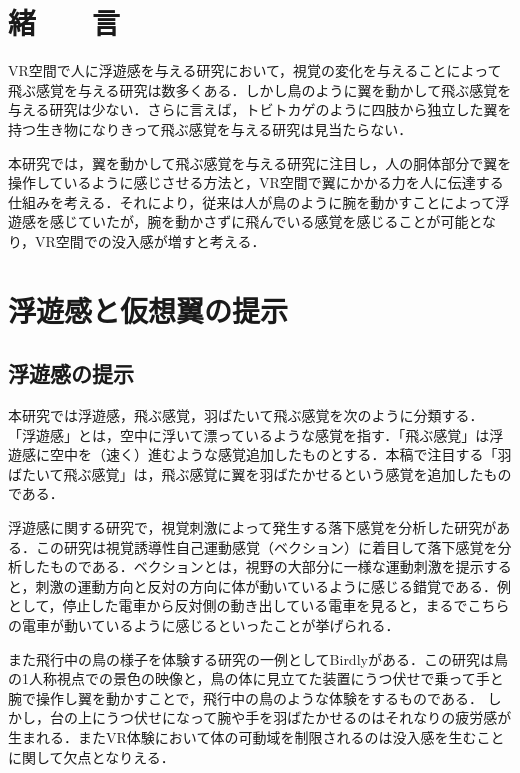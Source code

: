 \begin{small}
\section{緒　　言}
  VR空間で人に浮遊感を与える研究において，視覚の変化を与えることによって飛ぶ感覚を与える研究は数多くある．しかし鳥のように翼を動かして飛ぶ感覚を与える研究は少ない．さらに言えば，トビトカゲのように四肢から独立した翼を持つ生き物になりきって飛ぶ感覚を与える研究は見当たらない．

  本研究では，翼を動かして飛ぶ感覚を与える研究に注目し，人の胴体部分で翼を操作しているように感じさせる方法と，VR空間で翼にかかる力を人に伝達する仕組みを考える．それにより，従来は人が鳥のように腕を動かすことによって浮遊感を感じていたが，腕を動かさずに飛んでいる感覚を感じることが可能となり，VR空間での没入感が増すと考える．


\section{浮遊感と仮想翼の提示}
  \subsection{浮遊感の提示}
    本研究では浮遊感，飛ぶ感覚，羽ばたいて飛ぶ感覚を次のように分類する．
    「浮遊感」とは，空中に浮いて漂っているような感覚を指す．「飛ぶ感覚」は浮遊感に空中を（速く）進むような感覚追加したものとする．本稿で注目する「羽ばたいて飛ぶ感覚」は，飛ぶ感覚に翼を羽ばたかせるという感覚を追加したものである．

    浮遊感に関する研究で，視覚刺激によって発生する落下感覚を分析した研究がある\cite{奥川夏輝2017VR空間における視覚刺激によって発生する落下感覚の分析}．この研究は視覚誘導性自己運動感覚（ベクション）に着目して落下感覚を分析したものである．ベクションとは，視野の大部分に一様な運動刺激を提示すると，刺激の運動方向と反対の方向に体が動いているように感じる錯覚である\cite{妹尾武治2014ベクションとその周辺の近年の動向}．例として，停止した電車から反対側の動き出している電車を見ると，まるでこちらの電車が動いているように感じるといったことが挙げられる．

    また飛行中の鳥の様子を体験する研究の一例としてBirdly\cite{rheiner2014birdly}がある．この研究は鳥の1人称視点での景色の映像と，鳥の体に見立てた装置にうつ伏せで乗って手と腕で操作し翼を動かすことで，飛行中の鳥のような体験をするものである．
    しかし，台の上にうつ伏せになって腕や手を羽ばたかせるのはそれなりの疲労感が生まれる．またVR体験において体の可動域を制限されるのは没入感を生むことに関して欠点となりえる．


\end{small}
